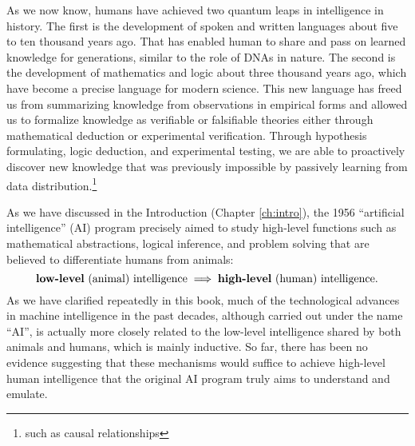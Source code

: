 \documentclass[\toplevelprefix/book-main.tex]{subfiles}
\begin{document}




As we now know, humans have achieved two quantum leaps in intelligence in history.
The first is the development of spoken and written languages about five to ten thousand years ago. That has enabled human to share and pass on learned knowledge for generations, similar to the role of DNAs in nature. The second is the development of mathematics and logic about three thousand years ago, which have become a precise language for modern science. This new language has freed us from summarizing knowledge from observations in empirical forms and allowed us to formalize knowledge as verifiable or falsifiable theories either through mathematical deduction or experimental verification. Through hypothesis formulating, logic deduction, and experimental testing, we are able to proactively discover new knowledge that was previously impossible by passively learning from data distribution.\footnote{such as causal relationships}

As we have discussed in the Introduction (Chapter \ref{ch:intro}), the 1956 ``artificial intelligence'' (AI) program precisely aimed to study high-level functions such as mathematical abstractions, logical inference, and problem solving that are believed to differentiate humans from animals: 
\begin{equation}
   \mbox{\textbf{low-level} (animal) intelligence} \; \Longrightarrow \; 
   \mbox{\textbf{high-level} (human) intelligence.}
\end{equation}
As we have clarified repeatedly in this book, much of the technological advances in machine intelligence in the past decades, although carried out under the name ``AI'', is actually more closely related to the low-level intelligence shared by both animals and humans, which is mainly inductive. So far, there has been no evidence suggesting that these mechanisms would suffice to achieve high-level human intelligence that the original AI program truly aims to understand and emulate. 
\end{document}
